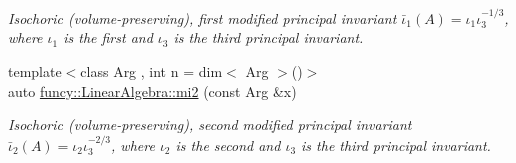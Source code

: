 \begin{DoxyCompactItemize}
\begin{DoxyCompactList}\small\item\em Isochoric (volume-\/preserving), first modified principal invariant $ \bar\iota_1(A)=\iota_1\iota_3^{-1/3} $, where $\iota_1$ is the first and $\iota_3$ is the third principal invariant. \end{DoxyCompactList}\item 
{\footnotesize template$<$class Arg , int n = dim$<$ Arg $>$()$>$ }\\auto \hyperlink{group__InvariantGroup_gac03f2f4188cc0c6acbbcaf01c480e6e8}{funcy\-::\-Linear\-Algebra\-::mi2} (const Arg \&x)
\begin{DoxyCompactList}\small\item\em Isochoric (volume-\/preserving), second modified principal invariant $ \bar\iota_2(A)=\iota_2\iota_3^{-2/3} $, where $\iota_2$ is the second and $\iota_3$ is the third principal invariant. \end{DoxyCompactList}\end{DoxyCompactItemize}

